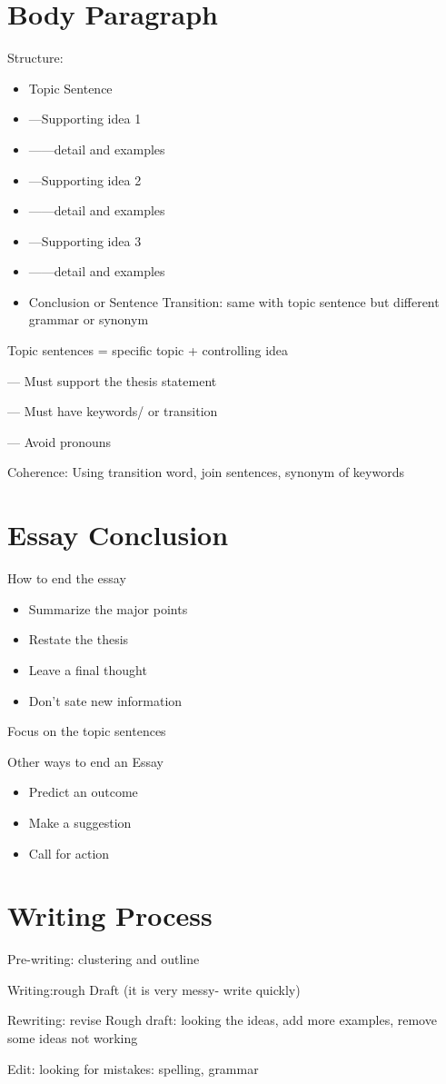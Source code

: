 \documentclass{article}
\begin{document}
\section{Body Paragraph}

Structure:

\begin{itemize}
\item{Topic Sentence}
\item{---Supporting idea 1}
\item{------detail and examples}
\item{---Supporting idea 2}
\item{------detail and examples}
\item{---Supporting idea 3}
\item{------detail and examples}
\item{Conclusion or Sentence Transition: same with topic sentence but different grammar or synonym}
\end{itemize}

Topic sentences = specific topic + controlling idea

--- Must support the thesis statement

--- Must have keywords/ or transition

--- Avoid pronouns

Coherence: Using transition word, join sentences, synonym of keywords
 
\section{Essay Conclusion}
How to end the essay
\begin{itemize}
\item{Summarize the major points}
\item{Restate the thesis}
\item{Leave a final thought}
\item{Don't sate new information}
\end{itemize}

Focus on the topic sentences

Other ways to end an Essay
\begin{itemize}
\item{Predict an outcome}
\item{Make a suggestion}
\item{Call for action}
\end{itemize}

\section{Writing Process}
Pre-writing: clustering and outline

Writing:rough Draft (it is very messy- write quickly)

Rewriting: revise Rough draft: looking the ideas, add more examples, remove some ideas not working

Edit: looking for mistakes: spelling, grammar
\end{document}
